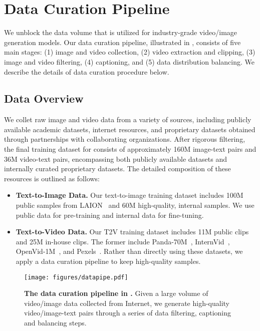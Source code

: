 \section{Data Curation Pipeline}

We unblock the data volume that is utilized for industry-grade video/image generation models. Our data curation pipeline, illustrated in , consists of five main stages: (1) image and video collection, (2) video extraction and clipping, (3) image and video filtering, (4) captioning, and (5) data distribution balancing. We describe the details of data curation procedure below.

\subsection{Data Overview}
We collet raw image and video data from a variety of sources, including publicly available academic datasets, internet resources, and proprietary datasets obtained through partnerships with collaborating organizations. After rigorous filtering, the final training dataset for \ours consists of approximately 160M image-text pairs and 36M video-text pairs, encompassing both publicly available datasets and internally curated proprietary datasets. The detailed composition of these resources is outlined as follows:
\begin{itemize}[align=parleft, left=0pt, labelsep=0.5em]
    \item \textbf{Text-to-Image Data.} Our text-to-image training dataset includes 100M public samples from LAION~\citep{schuhmann2022laion} and 60M high-quality, internal samples. We use public data for pre-training and internal data for fine-tuning. 
    \item \textbf{Text-to-Video Data. } Our T2V training dataset includes 11M public clips and 25M in-house clips. The former include Panda-70M~\citep{chen2024panda}, InternVid~\citep{wang2023internvid}, OpenVid-1M~\citep{nan2024openvid}, and Pexels~\citep{pku_yuan_lab_and_tuzhan_ai_etc_2024_10948109}. Rather than directly using these datasets, we apply a data curation pipeline to keep high-quality samples. 
\end{itemize}


\begin{figure}[t]
    \centering
    \texttt{[image: figures/datapipe.pdf]}
    \caption{\textbf{The data curation pipeline in \ours.} Given a large volume of video/image data collected from Internet, we generate high-quality video/image-text pairs through a series of data filtering, captioning and balancing steps.}
    \label{fig:data-pipeline}
\end{figure}



